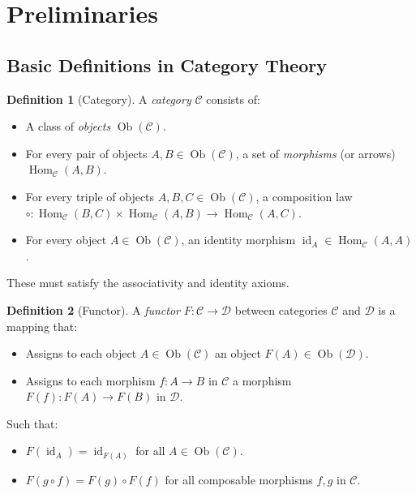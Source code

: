 \documentclass{article}
\theoremstyle{definition}
\newtheorem{definition}{Definition}[section]
\theoremstyle{remark}
\begin{document}
	\section{Preliminaries}
	
	\subsection{Basic Definitions in Category Theory}
	
	\begin{definition}[Category]
		A \emph{category} $\mathcal{C}$ consists of:
		\begin{itemize}
			\item A class of \emph{objects} $\operatorname{Ob}(\mathcal{C})$.
			\item For every pair of objects $A, B \in \operatorname{Ob}(\mathcal{C})$, a set of \emph{morphisms} (or arrows) $\operatorname{Hom}_{\mathcal{C}}(A, B)$.
			\item For every triple of objects $A, B, C \in \operatorname{Ob}(\mathcal{C})$, a composition law $\circ: \operatorname{Hom}_{\mathcal{C}}(B, C) \times \operatorname{Hom}_{\mathcal{C}}(A, B) \rightarrow \operatorname{Hom}_{\mathcal{C}}(A, C)$.
			\item For every object $A \in \operatorname{Ob}(\mathcal{C})$, an identity morphism $\operatorname{id}_A \in \operatorname{Hom}_{\mathcal{C}}(A, A)$.
		\end{itemize}
		These must satisfy the associativity and identity axioms.
	\end{definition}
	
	\begin{definition}[Functor]
		A \emph{functor} $F: \mathcal{C} \rightarrow \mathcal{D}$ between categories $\mathcal{C}$ and $\mathcal{D}$ is a mapping that:
		\begin{itemize}
			\item Assigns to each object $A \in \operatorname{Ob}(\mathcal{C})$ an object $F(A) \in \operatorname{Ob}(\mathcal{D})$.
			\item Assigns to each morphism $f: A \rightarrow B$ in $\mathcal{C}$ a morphism $F(f): F(A) \rightarrow F(B)$ in $\mathcal{D}$.
		\end{itemize}
		Such that:
		\begin{itemize}
			\item $F(\operatorname{id}_A) = \operatorname{id}_{F(A)}$ for all $A \in \operatorname{Ob}(\mathcal{C})$.
			\item $F(g \circ f) = F(g) \circ F(f)$ for all composable morphisms $f, g$ in $\mathcal{C}$.
		\end{itemize}
	\end{definition}
	
\end{document}
